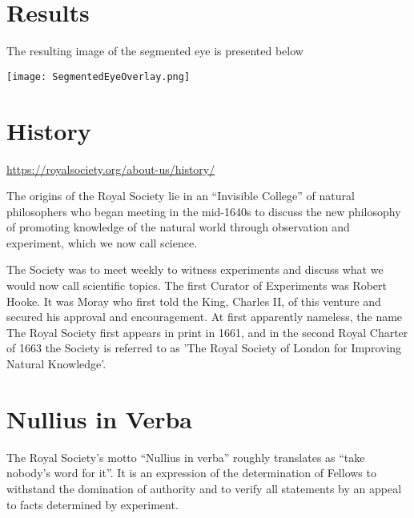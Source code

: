 \documentclass{article}
\begin{document}
\section{Results}

The resulting image of the segmented eye is presented below

\texttt{[image: SegmentedEyeOverlay.png]}

\section{History}

\url{https://royalsociety.org/about-us/history/}

The origins of the Royal Society lie in an ``Invisible College'' of natural
philosophers who began meeting in the mid-1640s to discuss the new philosophy
of promoting knowledge of the natural world through observation and experiment,
which we now call science.

The Society was to meet weekly to witness experiments and discuss what we would
now call scientific topics. The first Curator of Experiments was Robert Hooke.
It was Moray who first told the King, Charles II, of this venture and secured
his approval and encouragement. At first apparently nameless, the name The
Royal Society first appears in print in 1661, and in the second Royal Charter
of 1663 the Society is referred to as 'The Royal Society of London for
Improving Natural Knowledge'.

\section{Nullius in Verba}

The Royal Society's motto ``Nullius in verba'' roughly translates as ``take
nobody's word for it''. It is an expression of the determination of Fellows to
withstand the domination of authority and to verify all statements by an appeal
to facts determined by experiment.
\end{document}
